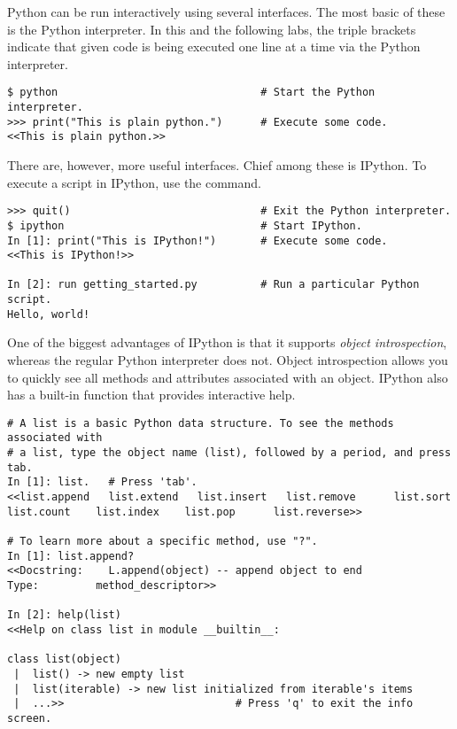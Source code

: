 Python can be run interactively using several interfaces.
The most basic of these is the Python interpreter.
In this and the following labs, the triple brackets \li{>>>} indicate that given code is being executed one line at a time via the Python interpreter.

\begin{lstlisting}
$ python                                # Start the Python interpreter.
>>> print("This is plain python.")      # Execute some code.
<<This is plain python.>>
\end{lstlisting}

There are, however, more useful interfaces.
Chief among these is IPython.
To execute a script in IPython, use the  command.

\begin{lstlisting}
>>> quit()                              # Exit the Python interpreter.
$ ipython                               # Start IPython.
In [1]: print("This is IPython!")       # Execute some code.
<<This is IPython!>>

In [2]: run getting_started.py          # Run a particular Python script.
Hello, world!
\end{lstlisting}

One of the biggest advantages of IPython is that it supports \emph{object introspection}, whereas the regular Python interpreter does not.
Object introspection allows you to quickly see all methods and attributes associated with an object.
IPython also has a built-in  function that provides interactive help.

\begin{lstlisting}
# A list is a basic Python data structure. To see the methods associated with
# a list, type the object name (list), followed by a period, and press tab.
In [1]: list.   # Press 'tab'.
<<list.append   list.extend   list.insert   list.remove      list.sort
list.count    list.index    list.pop      list.reverse>>

# To learn more about a specific method, use "?".
In [1]: list.append?
<<Docstring:    L.append(object) -- append object to end
Type:         method_descriptor>>

In [2]: help(list)
<<Help on class list in module __builtin__:

class list(object)
 |  list() -> new empty list
 |  list(iterable) -> new list initialized from iterable's items
 |  ...>>                           # Press 'q' to exit the info screen.
\end{lstlisting}

